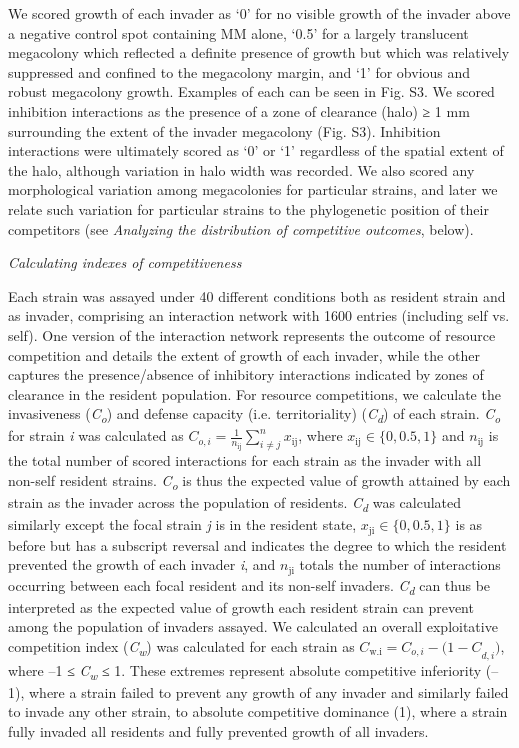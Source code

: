 We scored growth of each invader as `0' for no visible growth of the
invader above a negative control spot containing MM alone, `0.5' for a
largely translucent megacolony which reflected a definite presence of
growth but which was relatively suppressed and confined to the
megacolony margin, and `1' for obvious and robust megacolony growth.
Examples of each can be seen in Fig. S3. We scored inhibition
interactions as the presence of a zone of clearance (halo) ≥ 1 mm
surrounding the extent of the invader megacolony (Fig. S3). Inhibition
interactions were ultimately scored as `0' or `1' regardless of the
spatial extent of the halo, although variation in halo width was
recorded. We also scored any morphological variation among megacolonies
for particular strains, and later we relate such variation for
particular strains to the phylogenetic position of their competitors
(see \emph{Analyzing the distribution of competitive outcomes}, below).

\emph{Calculating indexes of competitiveness}

Each strain was assayed under 40 different conditions both as resident
strain and as invader, comprising an interaction network with 1600
entries (including self vs. self). One version of the interaction
network represents the outcome of resource competition and details the
extent of growth of each invader, while the other captures the
presence/absence of inhibitory interactions indicated by zones of
clearance in the resident population. For resource competitions, we
calculate the invasiveness (\emph{C\textsubscript{o}}) and defense
capacity (i.e. territoriality) (\emph{C\textsubscript{d}}) of each
strain. \emph{C\textsubscript{o}} for strain \emph{i} was calculated as
\(C_{o,i} = \frac{1}{n_{\text{ij}}}\sum_{i \neq j}^{n}x_{\text{ij}}\),
where \(x_{\text{ij}} \in \{ 0,0.5,1\}\) and \(n_{\text{ij}}\) is the
total number of scored interactions for each strain as the invader with
all non-self resident strains. \emph{C\textsubscript{o }}is thus the
expected value of growth attained by each strain as the invader across
the population of residents. \emph{C\textsubscript{d}} was calculated
similarly except the focal strain \emph{j} is in the resident state,
\(x_{\text{ji}} \in \{ 0,0.5,1\}\) is as before but has a subscript
reversal and indicates the degree to which the resident prevented the
growth of each invader \emph{i}, and \(n_{\text{ji}}\) totals the number
of interactions occurring between each focal resident and its non-self
invaders. \emph{C\textsubscript{d}} can thus be interpreted as the
expected value of growth each resident strain can prevent among the
population of invaders assayed. We calculated an overall exploitative
competition index (\emph{C\textsubscript{w}}) was calculated for each
strain as \(C_{\text{w.i}} = C_{o,i} - {(1 - C}_{d,i})\), where --1 ≤
\emph{\emph{C\textsubscript{w}}} ≤ 1. These extremes represent absolute
competitive inferiority (--1), where a strain failed to prevent any
growth of any invader and similarly failed to invade any other strain,
to absolute competitive dominance (1), where a strain fully invaded all
residents and fully prevented growth of all invaders.

